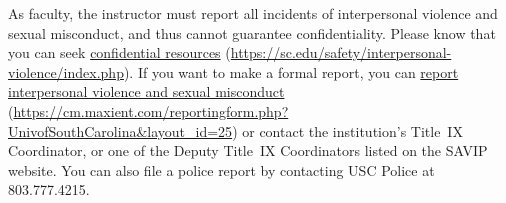 \documentclass[11pt,letterpaper]{article}
\begin{document}
As faculty, the instructor must report all incidents of interpersonal violence and sexual misconduct, and thus cannot guarantee confidentiality. Please know that you can seek \href{https://sc.edu/safety/interpersonal-violence/index.php}{confidential resources} (\url{https://sc.edu/safety/interpersonal-violence/index.php}). If you want to make a formal report, you can \href{https://cm.maxient.com/reportingform.php?UnivofSouthCarolina\&layout\_id=25}{report interpersonal violence and sexual misconduct} (\url{https://cm.maxient.com/reportingform.php?UnivofSouthCarolina\&layout\_id=25}) or contact the institution's Title~IX Coordinator, or one of the Deputy Title~IX Coordinators listed on the SAVIP website. You can also file a police report by contacting USC Police at 803.777.4215. \sectionbreak



\end{document}
